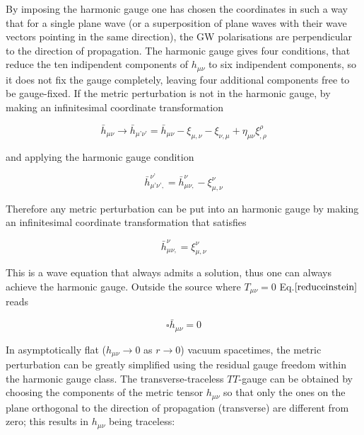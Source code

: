 \documentclass[binding=0.6cm, LaM]{sapthesis}
\begin{document}
	By imposing the harmonic gauge one has chosen the coordinates in such a way that for a single plane wave 
	(or a superposition of plane waves with their wave vectors pointing in the same direction),
	the GW polarisations are perpendicular to the direction of propagation.
	The harmonic gauge gives four conditions, that reduce the ten indipendent components of  
	$h_{\mu\nu}$ to six indipendent components, so it does not fix the gauge completely,
	leaving four additional components free to be gauge-fixed.
	If the metric perturbation is not in the harmonic gauge, by making an infinitesimal coordinate transformation

		\begin{equation}
		{\bar h}_{\mu\nu} \rightarrow {\bar h}_{\mu’\nu’}  = {\bar h}_{\mu\nu}  - \xi_{\mu,\nu} -\xi_{\nu,\mu} + \eta_{\mu\nu}\xi^{\rho}_{,\rho}
		\end{equation}

	and applying the harmonic gauge condition

		\begin{equation}
		{\bar h}_{\mu’\nu’,} ^{\nu’} = {\bar h}_{\mu\nu,} ^{\nu} - \xi_{\mu,\nu}^{\nu}
		\end{equation}

	Therefore any metric perturbation can be put into an harmonic gauge by making an infinitesimal 
	coordinate transformation that satisfies

		\begin{equation}
		{\bar h}_{\mu\nu,} ^{\nu} = \xi_{\mu,\nu}^{\nu}
		\end{equation}

	This is a wave equation that always admits a solution, thus one can always achieve the harmonic gauge. 
	Outside the source where $T_{\mu\nu} = 0$ Eq.$\ref{reduceinstein}$ reads 

		\begin{equation}
		\square {\bar h}_{\mu\nu} = 0
		\end{equation}

	In asymptotically flat ($h_{\mu\nu} \rightarrow 0$ as $r \rightarrow 0$) vacuum spacetimes, 
	the metric perturbation can be greatly simplified using
	the residual gauge freedom within the harmonic gauge class. 
	The transverse-traceless $TT$-gauge can be obtained by choosing the components of the metric tensor $h_{\mu\nu}$
	so that only the ones on the plane orthogonal to the direction of propagation (transverse) 
	are different from zero; this results in $h_{\mu\nu}$ being traceless:
\end{document}
